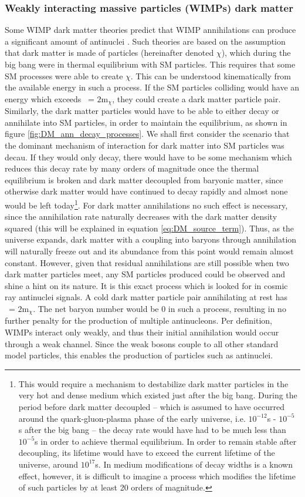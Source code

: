 \subsubsection{Weakly interacting massive particles (WIMPs) dark matter}\label{sec:WIMPS}
Some WIMP dark matter theories predict that WIMP annihilations can produce a significant amount of antinuclei \cite{}. Such theories are based on the assumption that dark matter is made of particles (hereinafter denoted $\chi$), which during the big bang were in thermal equilibrium with SM particles. This requires that some SM processes were able to create $\chi$. This can be understood kinematically from the available energy in such a process. If the SM particles colliding would have an energy which exceeds \Vs\ = $2\mathrm{m}_\chi$, they could create a dark matter particle pair. Similarly, the dark matter particles would have to be able to either decay or annihilate into SM particles, in order to maintain the equilibrium, as shown in figure \ref{fig:DM_ann_decay_processes}. We shall first consider the scenario that the dominant mechanism of interaction for dark matter into SM particles was decau. If they would only decay, there would have to be some mechanism which reduces this decay rate by many orders of magnitude once the thermal equilibrium is broken and dark matter decoupled from baryonic matter, since otherwise dark matter would have continued to decay rapidly and almost none would be left today\footnote{This would require a mechanism to destabilize dark matter particles in the very hot and dense medium which existed just after the big bang. During the period before dark matter decoupled -- which is assumed to have occurred around the quark-gluon-plasma phase of the early universe, i.e. $10^{-12}$s - $10^{-5}$ s after the big bang -- the decay rate would have had to be much less than $10^{-5}$s in order to achieve thermal equilibrium. In order to remain stable after decoupling, its lifetime would have to exceed the current lifetime of the universe, around $10^{17}$s. In medium modifications of decay widths is a known effect\cite{}, however, it is difficult to imagine a process which modifies the lifetime of such particles by at least 20 orders of magnitude.}. For dark matter annihilations no such effect is necessary, since the annihilation rate naturally decreases with the dark matter density squared (this will be explained in equation \ref{eq:DM_source_term}). Thus, as the universe expands, dark matter with a coupling into baryons through annihilation will naturally freeze out and its abundance from this point would remain almost constant. However, given that residual annihilations are still possible when two dark matter particles meet, any SM particles produced could be observed and shine a hint on its nature. It is this exact process which is looked for in cosmic ray antinuclei signals. A cold dark matter particle pair annihilating at rest has \Vs\ = $2\mathrm{m}_\chi$. The net baryon number would be 0 in such a process, resulting in no further penalty for the production of multiple antinucleons. Per definition, WIMPs interact only weakly, and thus their initial annihilation would occur through a weak channel. Since the weak bosons couple to all other standard model particles, this enables the production of particles such as antinuclei. \\
